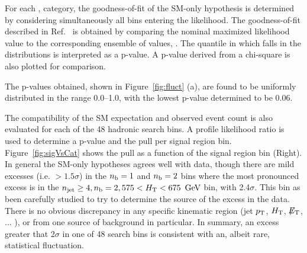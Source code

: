 For each \nb, \njet category, the goodness-of-fit of the SM-only hypothesis 
is determined by considering simultaneously all \scalht bins entering
the likelihood. The goodness-of-fit described in Ref.~\cite{Cowan:358560} is obtained
by comparing the nominal maximized likelihood value  to 
the corresponding ensemble of values, . The quantile in which 
falls in the distributions is interpreted as a p-value.  A p-value derived from
a chi-square is also plotted for comparison. 

The p-values obtained, shown in Figure~\ref{fig:fluct} (a), are found 
to be uniformly distributed in the range 0.0--1.0, with the lowest p-value
determined to be 0.06.

The compatibility of the SM expectation and observed event count is
also evaluated for each of the 48 hadronic search bins. A profile
likelihood ratio is used to determine a p-value and the pull per
signal region bin. Figure~\ref{fig:sigVsCat} shows the pull as a function
of the signal region bin (Right). In general the SM-only hypotheses
agrees well with data, though there are mild excesses (i.e. $> 1.5\sigma$)
in the $n_{\text{b}} = 1$ and $n_{\text{b}} = 2$ bins where the most pronounced excess is in
the $n_{\text{jet}} \geq 4, n_{\text{b}} = 2, 575 < \mbox{$H_\text{T}$} < 675~\,\text{Ge\hspace{-.08em}V}$ bin, with 2.4$\sigma$. This
bin as been carefully studied to try to determine the source of the excess
in the data.  There is no obvious discrepancy in any specific kinematic region
(jet $p_{\mathrm{T}}$, $\mbox{$H_\text{T}$}$, $\mbox{$\not\!\!E_\text{T}$}$, ... ), or from one source of background in particular.
In summary, an excess greater that 2$\sigma$ in one of 48 search bins is consistent with 
an, albeit rare, statistical fluctuation.

